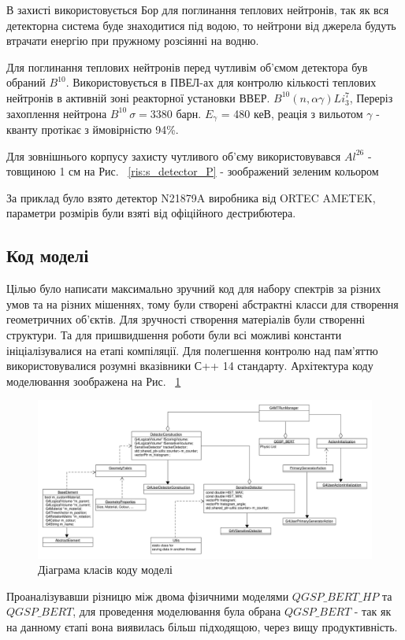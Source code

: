 \documentclass[a4paper, 14pt]{article}
\numberwithin{equation}{section}
\numberwithin{table}{section}
\begin{document}
	В захисті використовується Бор для поглинання теплових нейтронів, так як вся детекторна система буде знаходитися під водою, то нейтрони від джерела будуть втрачати енергію при пружному розсіянні на водню. 
	
	Для поглинання теплових нейтронів перед чутливім об'ємом детектора був обраний $B^{10}$. Використовується в ПВЕЛ-ах для контролю кількості теплових нейтронів в активній зоні реакторної установки ВВЕР. 
	$B^{10} ( n, \alpha \gamma)Li_3^7$, Переріз захоплення нейтрона $B^{10} \ \sigma = 3380$ барн.
	$E_\gamma$ = 480 кеВ, реація з вильотом $\gamma$ - кванту протікає з ймовірністю 94\%.
	
	Для зовнішнього корпусу захисту чутливого об'єму використовувався $Al^{26}$ - товщиною 1 см на Рис. ~\ref{ris:s_detector_P} - зоображений зеленим кольором 
	
	За приклад було взято детектор N21879A виробника від ORTEC AMETEK, параметри розмірів були взяті від офіційного дестрибютера.
	
\subsection{Код моделі}
Цілью було написати максимально зручний код для набору спектрів за різних умов та на різних мішеннях, тому були створені абстрактні класси для створення геометричних об'єктів. Для зручності створення матеріалів були створенні структури. 
Та для пришвидшення роботи були всі можливі константи ініціалізувалися на етапі компіляції. Для полегшення контролю над пам'яттю використовувалися розумні вказівники С++ 14 стандарту. Архітектура коду моделювання зоображена на Рис. ~\ref{ris:s_classDiagram} 
\begin{figure}[hbt!]
	\centering \includegraphics[width=1\textwidth]{res/classDiagram.pdf}
	\caption{Діаграма класів коду моделі} 
	\label{ris:s_classDiagram}	
\end{figure} 
Проаналізувавши різницю між двома фізичними моделями $QGSP\_BERT\_HP$ та $QGSP\_BERT$, для проведення моделювання була обрана $QGSP\_BERT$ - так як на данному єтапі вона виявилась більш підходящою, через вищу продуктивність.
	
\end{document}
